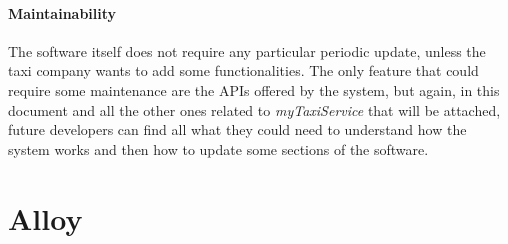 \documentclass[a4paper,11pt]{report} %
\newcommand{\mts}{\mbox{\normalfont\itshape myTaxiService}}
\begin{document}
	\paragraph{Maintainability} The software itself does not require any particular periodic update, unless the taxi company wants to add some functionalities. The only feature that could require some maintenance are the APIs offered by the system, but again, in this document and all the other ones related to \mts{} that will be attached, future developers can find all what they could need to understand how the system works and then how to update some sections of the software. 

%	
	
	\pagebreak

	\section{Alloy}
	
	
	\pagebreak
	
		\noindent%
		\begin{minipage}{\linewidth}
		\vspace*{-0.7cm}
		\end{minipage}	
		
\end{document}
